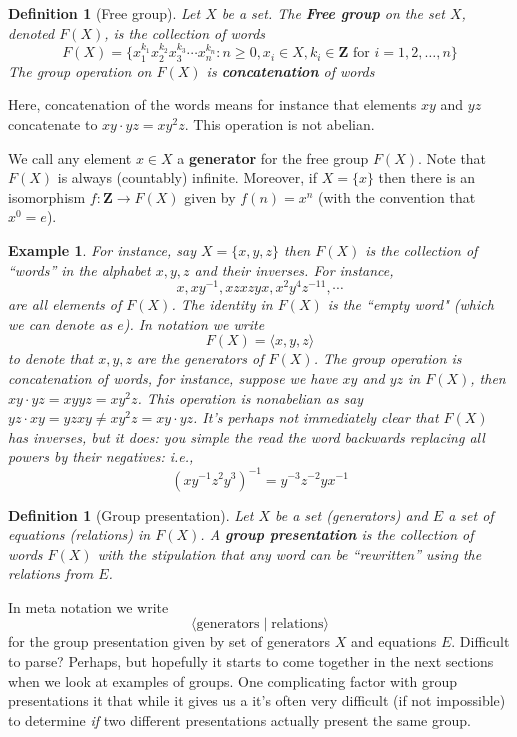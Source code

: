 \documentclass[12pt]{article}
\numberwithin{equation}{subsection}
\newtheorem{defn}[subsection]{Definition}
\theoremstyle{note}
\newtheorem{example}[subsection]{Example}
\begin{document}
\begin{defn}[Free group]
	Let $X$ be a set. The \textbf{Free group} on the set $X$, denoted $F(X)$,  is the collection of words \begin{equation} F(X)=\{ x_1^{k_1}x_2^{k_2}x_3^{k_3}\cdots x_n^{k_n} : n\geq 0, x_i\in X, k_i\in\mathbf{Z} \text{ for } i=1,2,\dots, n\} \end{equation}The group operation on $F(X)$ is \textbf{concatenation} of words
\end{defn}
Here, concatenation of the words means for instance that elements $xy$ and $yz$ concatenate to $xy\cdot yz=xy^2z$. This operation is not abelian.

We call any element $x\in X$ a \textbf{generator} for the free group $F(X)$. Note that $F(X)$ is always (countably) infinite. Moreover, if $X=\{x\}$ then there is an isomorphism $f\colon \mathbf{Z}\to F(X)$ given by $f(n)=x^n$ (with the convention that $x^0=e$). 

\begin{example}For instance, say $X=\{x,y,z\}$ then $F(X)$ is the collection of ``words'' in the alphabet $x,y,z$ and their inverses. For instance, \[ x, xy^{-1}, xzxzyx, x^2y^4z^{-11}, \cdots\] are all elements of $F(X)$.  The identity in $F(X)$ is the ``empty word" (which we can denote as $e$). In notation we write \[ F(X)=\langle x,y,z \rangle\] to denote that $x,y,z$ are the generators of $F(X)$. The group operation is concatenation of words, for instance, suppose we have $xy$ and $yz$ in $F(X)$, then $xy\cdot yz=xyyz=xy^2z$. This operation is nonabelian as say $yz\cdot xy=yzxy\neq xy^2z=xy\cdot yz$. It's perhaps not immediately clear that $F(X)$ has inverses, but it does: you simple the read the word backwards replacing all powers by their negatives: i.e., \[ (xy^{-1}z^2y^3)^{-1}=y^{-3}z^{-2}yx^{-1}\]

\end{example}


\begin{defn}[Group presentation]
	Let $X$ be a set (generators) and $E$ a set of equations (relations) in $F(X)$. A \textbf{group presentation} is the collection of words $F(X)$ with the stipulation that any word can be ``rewritten'' using the relations from $E$.%
\end{defn}
In meta notation we write \begin{equation} \langle \text{generators} \mid \text{relations} \rangle\end{equation} for the group presentation given by set of generators $X$ and equations $E$. 
Difficult to parse? Perhaps, but hopefully it starts to come together in the next sections when we look at examples of groups. One complicating factor with group presentations it that while it gives us a  it's often very difficult (if not impossible) to determine \textit{if} two different presentations actually present the same group. 
\end{document}
